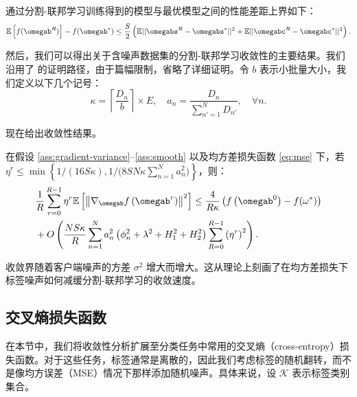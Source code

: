 \begin{lemma}\label{lemma:decomp}
通过分割-联邦学习训练得到的模型与最优模型之间的性能差距上界如下：
\begin{equation}
\mathbb{E}\left[f(\omegab^{R})\right]- f(\omegab^*)\le\frac{S}{2}\left(\mathbb{E}||\omegabs^{R}-\omegabs^*||^2+\mathbb{E}||\omegabc^{R}-\omegabc^*||^2\right).
\end{equation}
\end{lemma}

然后，我们可以得出关于含噪声数据集的分割-联邦学习收敛性的主要结果。我们沿用了 \cite{b8} 的证明路径，由于篇幅限制，省略了详细证明。令 $b$ 表示小批量大小，我们定义以下几个记号：
$$
\kappa= \left\lceil \frac{D_n}{b} \right\rceil \times E, \quad a_n= \frac{D_n}{\sum_{n'=1}^{N}D_{n'}}, \quad \forall n.
$$

现在给出收敛性结果。

\begin{theorem}[均方差损失下的收敛性]\label{theorem-nonconvex}
在假设 \ref{ass:gradient-variance}--\ref{ass:smooth} 以及均方差损失函数 \eqref{eq:mse} 下，若 $\eta^r \leq \min\left\{ {1}/{(16S\kappa)},  {1}/{(8SN\kappa\sum_{n=1}^Na_n^2})\right\}$，则：
\begin{equation}\label{bound-v2-nc-full}
\begin{aligned}
&\frac{1}{R}\sum_{r=0}^{R-1}\eta^r\mathbb{E}\left[\left\Vert
\nabla_{\omegab}f\left(\omegab^{r}\right)\right\Vert^2\right]\leq \frac{4}{R\kappa}\left(f\left(\omegab^{0}\right)-f(\omega^*)\right)\\
&+O\left(\frac{NS\kappa }{R} \sum_{n=1}^Na_n^2\left(\phi_n^2+\lambda^2+H_1^2+H_2^2\right)\sum_{R=0}^{R-1}\left(\eta^r\right)^2\right).
\end{aligned}
\end{equation}
\end{theorem}

收敛界随着客户端噪声的方差 $\sigma^2$ 增大而增大。这从理论上刻画了在均方差损失下标签噪声如何减缓分割-联邦学习的收敛速度。

\subsection{交叉熵损失函数}
在本节中，我们将收敛性分析扩展至分类任务中常用的交叉熵（cross-entropy）损失函数。对于这些任务，标签通常是离散的，因此我们考虑标签的随机翻转，而不是像均方误差（MSE）情况下那样添加随机噪声。具体来说，设 $\mathcal{K}$ 表示标签类别集合。

